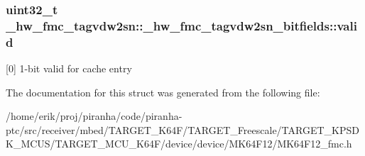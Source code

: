 \subsubsection[{\texorpdfstring{valid}{valid}}]{\setlength{\rightskip}{0pt plus 5cm}uint32\+\_\+t \+\_\+hw\+\_\+fmc\+\_\+tagvdw2sn\+::\+\_\+hw\+\_\+fmc\+\_\+tagvdw2sn\+\_\+bitfields\+::valid}\hypertarget{struct__hw__fmc__tagvdw2sn_1_1__hw__fmc__tagvdw2sn__bitfields_a0e7da1735b5140608cf6ac9ae0e8fc3c}{}\label{struct__hw__fmc__tagvdw2sn_1_1__hw__fmc__tagvdw2sn__bitfields_a0e7da1735b5140608cf6ac9ae0e8fc3c}
\mbox{[}0\mbox{]} 1-\/bit valid for cache entry 

The documentation for this struct was generated from the following file\+:\begin{DoxyCompactItemize}
\item 
/home/erik/proj/piranha/code/piranha-\/ptc/src/receiver/mbed/\+T\+A\+R\+G\+E\+T\+\_\+\+K64\+F/\+T\+A\+R\+G\+E\+T\+\_\+\+Freescale/\+T\+A\+R\+G\+E\+T\+\_\+\+K\+P\+S\+D\+K\+\_\+\+M\+C\+U\+S/\+T\+A\+R\+G\+E\+T\+\_\+\+M\+C\+U\+\_\+\+K64\+F/device/device/\+M\+K64\+F12/M\+K64\+F12\+\_\+fmc.\+h\end{DoxyCompactItemize}
